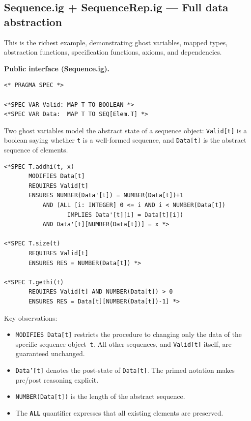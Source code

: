\documentclass[11pt]{article}
\newcommand{\m}[1]{\texttt{#1}}
\newcommand{\kw}[1]{\texttt{\textbf{#1}}}
\begin{document}
\subsection{Sequence.ig + SequenceRep.ig --- Full data abstraction}
\label{sec:seq}

This is the richest example, demonstrating ghost variables, mapped
types, abstraction functions, specification functions, axioms, and
dependencies.

\medskip\noindent\textbf{Public interface (Sequence.ig).}

\begin{lstlisting}[language=ESC]
<* PRAGMA SPEC *>

<*SPEC VAR Valid: MAP T TO BOOLEAN *>
<*SPEC VAR Data:  MAP T TO SEQ[Elem.T] *>
\end{lstlisting}

Two ghost variables model the abstract state of a sequence object:
\m{Valid[t]} is a boolean saying whether \m{t} is a well-formed
sequence, and \m{Data[t]} is the abstract sequence of elements.

\begin{lstlisting}[language=ESC]
<*SPEC T.addhi(t, x)
       MODIFIES Data[t]
       REQUIRES Valid[t]
       ENSURES NUMBER(Data'[t]) = NUMBER(Data[t])+1
           AND (ALL [i: INTEGER] 0 <= i AND i < NUMBER(Data[t])
                  IMPLIES Data'[t][i] = Data[t][i])
           AND Data'[t][NUMBER(Data[t])] = x *>

<*SPEC T.size(t)
       REQUIRES Valid[t]
       ENSURES RES = NUMBER(Data[t]) *>

<*SPEC T.gethi(t)
       REQUIRES Valid[t] AND NUMBER(Data[t]) > 0
       ENSURES RES = Data[t][NUMBER(Data[t])-1] *>
\end{lstlisting}

Key observations:
\begin{itemize}[nosep]
  \item \m{MODIFIES Data[t]} restricts the procedure to changing only
    the data of the specific sequence object~\m{t}.  All other
    sequences, and \m{Valid[t]} itself, are guaranteed unchanged.
  \item \m{Data'[t]} denotes the post-state of \m{Data[t]}.  The
    primed notation makes pre/post reasoning explicit.
  \item \m{NUMBER(Data[t])} is the length of the abstract sequence.
  \item The \kw{ALL} quantifier expresses that all existing elements
    are preserved.
\end{itemize}
\end{document}
